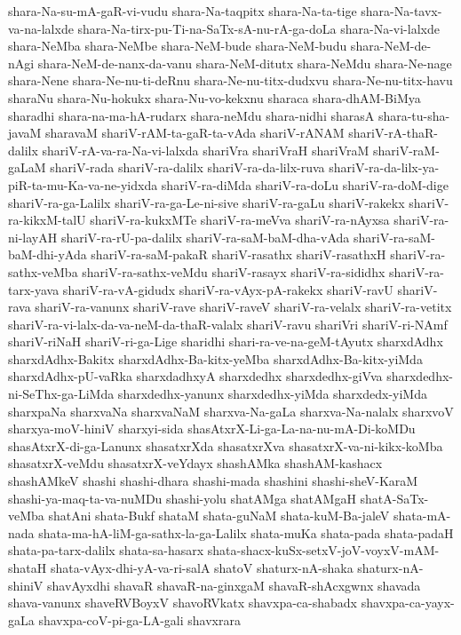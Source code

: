 {shara-Na-su-mA-gaR-vi-vudu
shara-Na-taqpitx
shara-Na-ta-tige
shara-Na-tavx-va-na-lalxde
shara-Na-tirx-pu-Ti-na-SaTx-sA-nu-rA-ga-doLa
shara-Na-vi-lalxde
shara-NeMba
shara-NeMbe
shara-NeM-bude
shara-NeM-budu
shara-NeM-de-nAgi
shara-NeM-de-nanx-da-vanu
shara-NeM-ditutx
shara-NeMdu
shara-Ne-nage
shara-Nene
shara-Ne-nu-ti-deRnu
shara-Ne-nu-titx-dudxvu
shara-Ne-nu-titx-havu
sharaNu
shara-Nu-hokukx
shara-Nu-vo-kekxnu
sharaca
shara-dhAM-BiMya
sharadhi
shara-na-ma-hA-rudarx
shara-neMdu
shara-nidhi
sharasA
shara-tu-sha-javaM
sharavaM
shariV-rAM-ta-gaR-ta-vAda
shariV-rANAM
shariV-rA-thaR-dalilx
shariV-rA-va-ra-Na-vi-lalxda
shariVra
shariVraH
shariVraM
shariV-raM-gaLaM
shariV-rada
shariV-ra-dalilx
shariV-ra-da-lilx-ruva
shariV-ra-da-lilx-ya-piR-ta-mu-Ka-va-ne-yidxda
shariV-ra-diMda
shariV-ra-doLu
shariV-ra-doM-dige
shariV-ra-ga-Lalilx
shariV-ra-ga-Le-ni-sive
shariV-ra-gaLu
shariV-rakekx
shariV-ra-kikxM-talU
shariV-ra-kukxMTe
shariV-ra-meVva
shariV-ra-nAyxsa
shariV-ra-ni-layAH
shariV-ra-rU-pa-dalilx
shariV-ra-saM-baM-dha-vAda
shariV-ra-saM-baM-dhi-yAda
shariV-ra-saM-pakaR
shariV-rasathx
shariV-rasathxH
shariV-ra-sathx-veMba
shariV-ra-sathx-veMdu
shariV-rasayx
shariV-ra-sididhx
shariV-ra-tarx-yava
shariV-ra-vA-gidudx
shariV-ra-vAyx-pA-rakekx
shariV-ravU
shariV-rava
shariV-ra-vanunx
shariV-rave
shariV-raveV
shariV-ra-velalx
shariV-ra-vetitx
shariV-ra-vi-lalx-da-va-neM-da-thaR-valalx
shariV-ravu
shariVri
shariV-ri-NAmf
shariV-riNaH
shariV-ri-ga-Lige
sharidhi
shari-ra-ve-na-geM-tAyutx
sharxdAdhx
sharxdAdhx-Bakitx
sharxdAdhx-Ba-kitx-yeMba
sharxdAdhx-Ba-kitx-yiMda
sharxdAdhx-pU-vaRka
sharxdadhxyA
sharxdedhx
sharxdedhx-giVva
sharxdedhx-ni-SeThx-ga-LiMda
sharxdedhx-yanunx
sharxdedhx-yiMda
sharxdedx-yiMda
sharxpaNa
sharxvaNa
sharxvaNaM
sharxva-Na-gaLa
sharxva-Na-nalalx
sharxvoV
sharxya-moV-hiniV
sharxyi-sida
shasAtxrX-Li-ga-La-na-nu-mA-Di-koMDu
shasAtxrX-di-ga-Lanunx
shasatxrXda
shasatxrXva
shasatxrX-va-ni-kikx-koMba
shasatxrX-veMdu
shasatxrX-veYdayx
shashAMka
shashAM-kashacx
shashAMkeV
shashi
shashi-dhara
shashi-mada
shashini
shashi-sheV-KaraM
shashi-ya-maq-ta-va-nuMDu
shashi-yolu
shatAMga
shatAMgaH
shatA-SaTx-veMba
shatAni
shata-Bukf
shataM
shata-guNaM
shata-kuM-Ba-jaleV
shata-mA-nada
shata-ma-hA-liM-ga-sathx-la-ga-Lalilx
shata-muKa
shata-pada
shata-padaH
shata-pa-tarx-dalilx
shata-sa-hasarx
shata-shacx-kuSx-setxV-joV-voyxV-mAM-shataH
shata-vAyx-dhi-yA-va-ri-salA
shatoV
shaturx-nA-shaka
shaturx-nA-shiniV
shavAyxdhi
shavaR
shavaR-na-ginxgaM
shavaR-shAcxgwnx
shavada
shava-vanunx
shaveRVBoyxV
shavoRVkatx
shavxpa-ca-shabadx
shavxpa-ca-yayx-gaLa
shavxpa-coV-pi-ga-LA-gali
shavxrara
}
